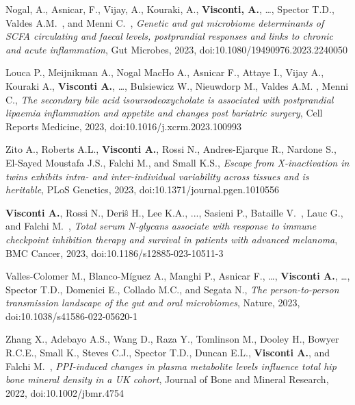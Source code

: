 \begin{itemize}
		 Nogal, A., Asnicar, F., Vijay, A., Kouraki, A., \textbf{Visconti, A.}, \dots, Spector T.D., Valdes A.M.\colast ~\corresponding, and Menni C.\colast ~\corresponding, \emph{Genetic and gut microbiome determinants of SCFA circulating and faecal levels, postprandial responses and links to chronic and acute inflammation}, Gut Microbes, 2023, doi:10.1080/19490976.2023.2240050 %
		
		 Louca P., Meijnikman A., Nogal MacHo A., Asnicar F., Attaye I., Vijay A., Kouraki A., \textbf{Visconti A.}, \dots, Bulsiewicz W., Nieuwdorp M., Valdes A.M. \corresponding, Menni C.\corresponding, \emph{The secondary bile acid isoursodeoxycholate is associated with postprandial lipaemia inflammation and appetite and changes post bariatric surgery}, Cell Reports Medicine, 2023, doi:10.1016/j.xcrm.2023.100993	%
		
		  Zito A.\corresponding, Roberts A.L.\cofirst, \textbf{Visconti A.}\cofirst, Rossi N., Andres-Ejarque R., Nardone S., El-Sayed Moustafa J.S., Falchi M., and Small K.S.\corresponding, \emph{Escape from X-inactivation in twins exhibits intra- and inter-individual variability across tissues and is heritable}, PLoS Genetics, 2023, doi:10.1371/journal.pgen.1010556 %
				
		 \textbf{Visconti A.}, Rossi N., Deri\^s H., Lee K.A., ..., Sasieni P., Bataille V.\colast ~\corresponding,  Lauc G.\colast, and Falchi M.\colast ~\corresponding, \emph{Total serum N‐glycans associate with response to immune checkpoint inhibition therapy and survival in patients with advanced melanoma}, BMC Cancer, 2023, doi:10.1186/s12885-023-10511-3 %
		
		  Valles-Colomer M.\corresponding, Blanco-Míguez A., Manghi P., Asnicar F., \dots, \textbf{Visconti A.}, \dots, Spector T.D., Domenici E., Collado M.C., and Segata N.\corresponding, \emph{The person-to-person transmission landscape of the gut and oral microbiomes}, Nature, 2023, doi:10.1038/s41586-022-05620-1 %
		
	  Zhang X., Adebayo A.S., Wang D., Raza Y., Tomlinson M., Dooley H., Bowyer R.C.E., Small K., Steves C.J., Spector T.D., Duncan E.L., \textbf{Visconti A.}\colast, and Falchi M.\colast ~\corresponding, \emph{PPI-induced changes in plasma metabolite levels influence total hip bone mineral density in a UK cohort}, Journal of Bone and Mineral Research, 2022, doi:10.1002/jbmr.4754 %
	 

\end{itemize}
